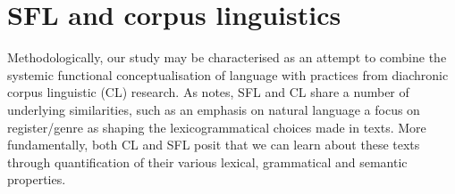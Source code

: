 


	\section{SFL and corpus linguistics}

		Methodologically, our study may be characterised as an attempt to combine the systemic functional conceptualisation of language with practices from diachronic corpus linguistic (CL) research. As  notes, SFL and CL share a number of underlying similarities, such as an emphasis on natural language a focus on register/genre as shaping the lexicogrammatical choices made in texts. More fundamentally, both CL and SFL posit that we can learn about these texts through quantification of their various lexical, grammatical and semantic properties. %

